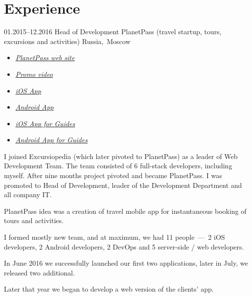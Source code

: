 \documentclass[12pt,a4paper,oneside,final]{moderncv}
\begin{document}
\section{Experience}
\cventry
{01.2015--12.2016}
{Head of Development}
{
  PlanetPass (travel startup, tours, excursions and activities)
}
{Russia,~Moscow}
{}
{
  \begin{itemize}
    \item \underline{\href{https://planetpass.com}{\itshape PlanetPass web site}}
    \item \underline{\href{https://vimeo.com/176452074}{\itshape Promo video}}
    \item \underline{\href{https://itunes.apple.com/us/app/planetpass-city-walks-with-guides/id1087995218}{\itshape iOS App}}
    \item \underline{\href{https://play.google.com/store/apps/details?id=com.excursiopedia.planetpass}{\itshape Android App}}
    \item \underline{\href{https://itunes.apple.com/us/app/tool-for-guides/id1129160306}{\itshape iOS App for Guides}}
    \item \underline{\href{https://play.google.com/store/apps/details?id=com.excursiopedia.guide}{\itshape Android App for Guides}}
  \end{itemize}
  \smallskip
  {\parindent=0.7cm
    I joined Excursiopedia (which later pivoted to PlanetPass) as a leader of Web Development Team. The team consisted of 6 full-stack developers, including myself. After nine months project pivoted and became PlanetPass. I was promoted to Head of Development, leader of the Development Department and all company IT.

    PlanetPass idea was a creation of travel mobile app for instantaneous booking of tours and activities.

    I formed mostly new team, and at maximum, we had 11 people~---~2 iOS developers, 2 Android developers, 2 DevOps and 5 server-side / web developers.

    In June 2016 we successfully launched our first two applications, later in July, we released two additional.

    Later that year we began to develop a web version of the clients' app.
  }
}
\end{document}
